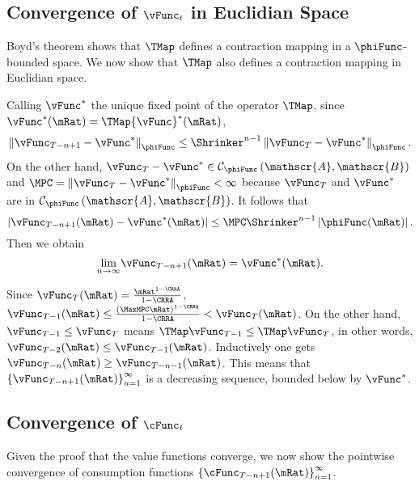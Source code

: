 \documentclass[\econtexRoot/BufferStockTheory]{subfiles}
\begin{document}
\subsection{Convergence of $\vFunc_{t}$ in Euclidian Space}\label{sec:vEuclidian}

Boyd's theorem shows that $\TMap$ defines a contraction mapping
in a $\phiFunc$-bounded space. We now show that $\TMap$ also
defines a contraction mapping in Euclidian space.

Calling $\vFunc^{\ast}$ the unique fixed point of the operator $\TMap$, since $\vFunc^{\ast }(\mRat)=\TMap {\vFunc}^{\ast }(\mRat)$,
\begin{equation}
\left\Vert \vFunc_{T-n+1}-\vFunc^{\ast }\right\Vert _{\phiFunc }\leq \Shrinker
^{n-1}\left\Vert \vFunc_{T}-\vFunc^{\ast }\right\Vert _{\phiFunc }.
\end{equation}%
On the other hand, $\vFunc_{T}-\vFunc^{\ast }\in \mathcal{C}_{\phiFunc }\left( \mathscr{A},
\mathscr{B}\right) $ and $\MPC =\left\Vert \vFunc_{T}-\vFunc^{\ast }\right\Vert_{\phiFunc }<\infty $ because $\vFunc_{T}$ and $\vFunc^{\ast }$ are in $\mathcal{C}_{\phiFunc
}\left( \mathscr{A},\mathscr{B}\right) $. It follows that%
\begin{equation}
\left\vert \vFunc_{T-n+1}(\mRat)-\vFunc^{\ast }(\mRat)\right\vert \leq \MPC \Shrinker^{n-1}\left\vert \phiFunc(\mRat)\right\vert.
\end{equation}%
Then we obtain
\begin{equation}
\underset{n\rightarrow \infty }{\lim }\vFunc_{T-n+1}(\mRat)=\vFunc^{\ast }(\mRat).
\end{equation}

Since $\vFunc_{T}(\mRat)=\frac{\mRat^{1-\CRRA }}{1-\CRRA }$, $\vFunc_{T-1}(\mRat)\leq \frac{\left(\MaxMPC \mRat\right)^{1-\CRRA}}{1-\CRRA}<\vFunc_{T}(\mRat)$. On the other hand, $\vFunc_{T-1}\leq \vFunc_{T}$
means $\TMap\vFunc_{T-1}\leq \TMap\vFunc_{T}$, in other words, $\vFunc_{T-2}(\mRat)\leq \vFunc_{T-1}(\mRat)$.
Inductively one gets $\vFunc_{T-n}(\mRat)\geq \vFunc_{T-n-1}(\mRat)$. This means that $\left\{
\vFunc_{T-n+1}(\mRat)\right\} _{n=1}^{\infty }$ is a decreasing sequence,
bounded below by $\vFunc^{\ast}$.

\subsection{Convergence of $\cFunc_{t}$}
\label{subsec:cConverges}%

Given the proof that the value functions converge, we now show the
pointwise convergence of consumption functions
$\left\{\cFunc_{T-n+1}(\mRat)\right\} _{n=1}^{\infty }$.
\end{document}
